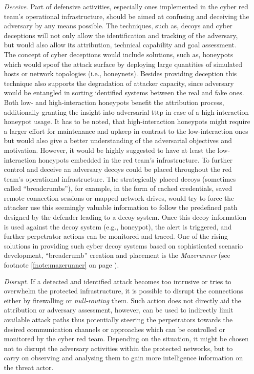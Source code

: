\textit{Deceive}. Part of defensive activities, especially ones implemented in the cyber red team's operational infrastructure, should be aimed at confusing and deceiving the adversary by any means possible. The techniques, such as, decoys and cyber deceptions will not only allow the identification and tracking of the adversary, but would also allow its attribution, technical capability and goal assessment. The concept of cyber deceptions would include solutions, such as, honeypots which would spoof the attack surface by deploying large quantities of simulated hosts or network topologies (i.e., honeynets). Besides providing deception this technique also supports the degradation of attacker capacity, since adversary would be entangled in sorting identified systems between the real and fake ones. Both low- and high-interaction honeypots benefit the attribution process, additionally granting the insight into adversarial \gls{tttp} in case of a high-interaction honeypot usage. It has to be noted, that high-interaction honeypots might require a larger effort for maintenance and upkeep in contrast to the low-interaction ones but would also give a better understanding of the adversarial objectives and motivation. However, it would be highly suggested to have at least the low-interaction honeypots embedded in the red team's infrastructure.
To further control and deceive an adversary decoys could be placed throughout the red team's operational infrastructure. The strategically placed decoys (sometimes called ``breadcrumbs''), for example, in the form of cached credentials, saved remote connection sessions or mapped network drives, would try to force the attacker use this seemingly valuable information to follow the predefined path designed by the defender leading to a decoy system. Once this decoy information is used against the decoy system (e.g., honeypot), the alert is triggered, and further perpetrator actions can be monitored and traced. One of the rising solutions in providing such cyber decoy systems based on sophisticated scenario development, ``breadcrumb'' creation and placement is the \textit{Mazerunner} (see footnote \ref{fnote:mazerunner} on page \pageref{fnote:mazerunner}).

\textit{Disrupt}. If a detected and identified attack becomes too intrusive or tries to overwhelm the protected infrastructure, it is possible to disrupt the connections either by firewalling or \textit{null-routing} them. Such action does not directly aid the attribution or adversary assessment, however, can be used to indirectly limit available attack paths thus potentially steering the perpetrators towards the desired communication channels or approaches which can be controlled or monitored by the cyber red team. Depending on the situation, it might be chosen not to disrupt the adversary activities within the protected networks, but to carry on observing and analysing them to gain more intelligence information on the threat actor.

